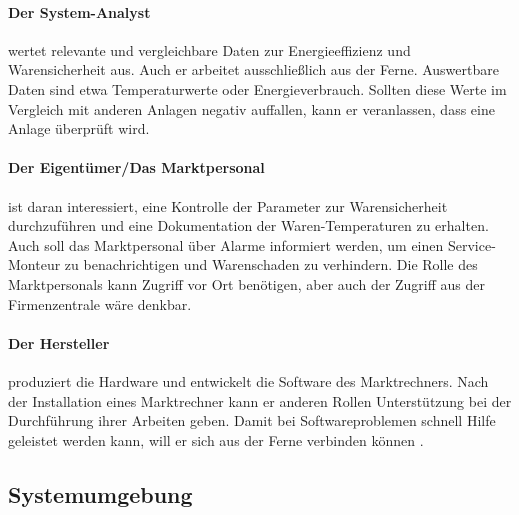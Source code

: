 \documentclass[11pt,a4paper]{report}
\begin{document}
\paragraph{Der System-Analyst} wertet relevante und vergleichbare Daten zur Energieeffizienz und Warensicherheit aus. Auch er arbeitet ausschließlich aus der Ferne. Auswertbare Daten sind etwa Temperaturwerte oder Energieverbrauch. Sollten diese Werte im Vergleich mit anderen Anlagen negativ auffallen, kann er veranlassen, dass eine Anlage überprüft wird.

\paragraph{Der Eigentümer/Das Marktpersonal} ist daran interessiert, eine Kontrolle der Parameter zur Warensicherheit durchzuführen und eine Dokumentation der Waren-Temperaturen zu erhalten. Auch soll das Marktpersonal über Alarme informiert werden, um einen Service-Monteur zu benachrichtigen und Warenschaden zu verhindern. Die Rolle des Marktpersonals kann Zugriff vor Ort benötigen, aber auch der Zugriff aus der Firmenzentrale wäre denkbar.

\paragraph{Der Hersteller} produziert die Hardware und entwickelt die Software des Marktrechners. Nach der Installation eines Marktrechner kann er anderen Rollen Unterstützung bei der Durchführung ihrer Arbeiten geben. Damit bei Softwareproblemen schnell Hilfe geleistet werden kann, will er sich aus der Ferne verbinden können	. 

\subsection{Systemumgebung}
\end{document}
